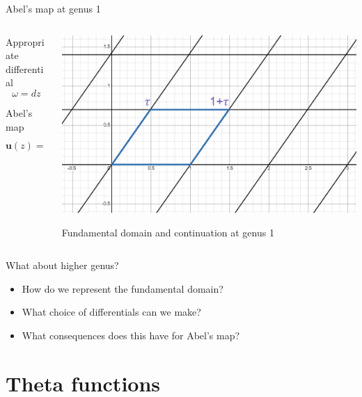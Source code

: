 \documentclass[11pt,aspectratio=169]{beamer}
\begin{document}
\begin{frame}{Abel's map at genus 1}
    \begin{columns}[onlytextwidth]
        \begin{column}{0.55\textwidth}
            Appropriate differential
            \[\omega = dz\]
            
            Abel's map
            \[\mathbf{u}(z) = \int_0^z \omega = z\]
        \end{column}
        \begin{column}{0.45\textwidth}
            \center{}
            \includegraphics[width=\columnwidth]{assets/Domain.png}

            \tiny Fundamental domain and continuation at genus 1
        \end{column}
    \end{columns}

    {
    \begin{block}{What about higher genus?}
        \begin{itemize}
            \item How do we represent the fundamental domain?
            \item What choice of differentials can we make?
            \item What consequences does this have for Abel's map?
        \end{itemize}
    \end{block}
    }
\end{frame}

\section{Theta functions}
\end{document}
